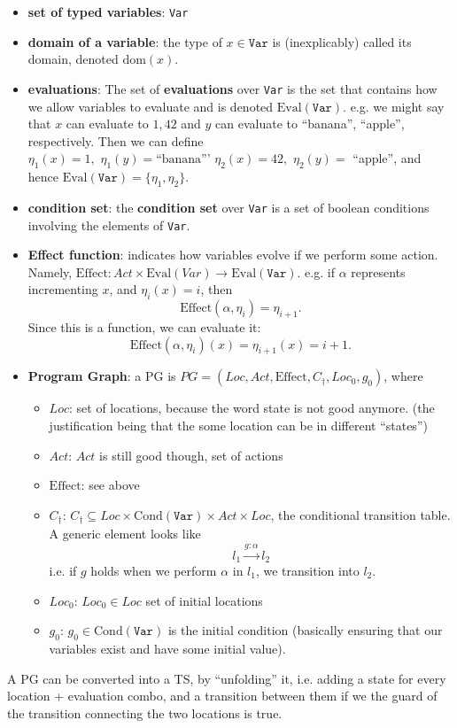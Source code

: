 \documentclass{article}
\begin{document}
\begin{itemize}
\item \textbf{set of typed variables}: \texttt{Var}
\item \textbf{domain of a variable}: the type of $x \in \texttt{Var}$ is
  (inexplicably) called its domain, denoted $\text{dom}(x)$.

\item \textbf{evaluations}: The set of \textbf{evaluations} over \texttt{Var} is
  the set that contains how we allow variables to evaluate and is denoted
  $\text{Eval}(\texttt{Var})$. e.g. we might say
  that $x$ can evaluate to $1, 42$ and $y$ can evaluate to ``banana'',
  ``apple'', respectively. Then we
  can define $\eta_1(x)=1,\,\,\eta_1(y)=\text{``banana'''}\,\,\eta_2(x)=42,\,\,\eta_2(y)=$ ``apple'', and hence
  $\text{Eval}(\texttt{Var}) = \{\eta_1, \eta_2\}$.

\item \textbf{condition set}: the \textbf{condition set} over \texttt{Var} is a
  set of boolean conditions involving the elements of \texttt{Var}.

\item \textbf{Effect function}: indicates how variables evolve if we perform
  some action. Namely, $\text{Effect}: Act \times \text{Eval}(Var) \rightarrow
  \text{Eval}(\texttt{Var})$. e.g. if $\alpha$ represents incrementing $x$, and
  $\eta_i(x) = i$, then
  \[
    \text{Effect}(\alpha, \eta_i) = \eta_{i + 1}.
  \]
  Since this is a function, we can evaluate it:
  \[
    \text{Effect}(\alpha, \eta_i)(x) = \eta_{i + 1}(x) = i + 1.
  \]

\item \textbf{Program Graph}: a PG is $PG = (Loc, Act, \text{Effect}, C_\dagger, Loc_0,
  g_0)$, where
  \begin{itemize}
  \item $Loc$: set of locations, because the word state is not good anymore.
    (the justification being that the some location can be in different ``states'')
  \item $Act$: $Act$ is still good though, set of actions 
  \item $\text{Effect}$: see above
  \item $C_\dagger$: $C_\dagger \subseteq Loc \times
    \text{Cond}(\texttt{Var})\times Act \times Loc$, the conditional transition
    table. A generic element looks like
    \[
      l_1 \xrightarrow{g:\alpha} l_2
    \]
    i.e. if $g$ holds when we perform $\alpha$ in $l_1$, we transition into $l_2$.
  \item $Loc_0$: $Loc_0 \in Loc$ set of initial locations
  \item $g_0$: $g_0 \in \text{Cond}(\texttt{Var})$ is the initial condition
    (basically ensuring that our variables exist and have some initial value).
  \end{itemize}
\end{itemize}
A PG can be converted into a TS, by ``unfolding'' it, i.e. adding a state for
every location + evaluation combo, and a transition between them if we the guard
of the transition connecting the two locations is true.
\end{document}
